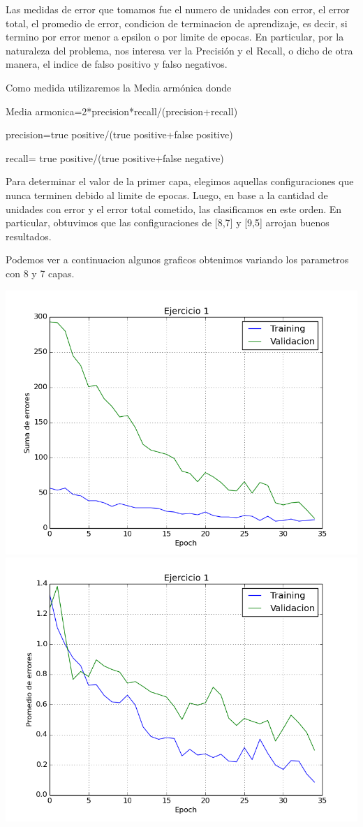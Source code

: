 Las medidas de error que tomamos fue el numero de unidades con error, el error total, el promedio de error, condicion de terminacion de aprendizaje, es decir, si termino por error menor a epsilon o por limite de epocas. En particular, por la naturaleza del problema, nos interesa ver la Precisión y el Recall, o dicho de otra manera, el indice de falso positivo y falso negativos. 

Como medida utilizaremos la Media armónica donde 

Media armonica=2*precision*recall/(precision+recall)

precision=true positive/(true positive+false positive)

recall= true positive/(true positive+false negative)


Para determinar el valor de la primer capa, elegimos aquellas configuraciones que nunca terminen debido al limite de epocas. Luego, en base a la cantidad de unidades con error y el error total cometido, las clasificamos en este orden. 
En particular, obtuvimos que las configuraciones de [8,7] y [9,5] arrojan buenos resultados.

Podemos ver a continuacion algunos graficos obtenimos variando los parametros con 8 y 7 capas.

\includegraphics[scale=0.4]{img/ej100207187sum}
\includegraphics[scale=0.4]{img/ej100207187mean}

